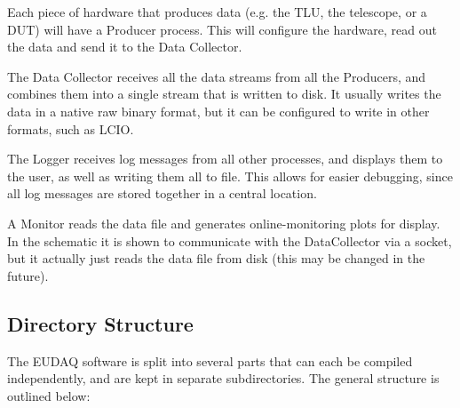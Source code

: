 Each piece of hardware that produces data (e.g. the \gls{TLU}, the telescope, or a \gls{DUT}) will have a Producer process.
This will configure the hardware, read out the data and send it to the Data Collector.

The Data Collector receives all the data streams from all the Producers,
and combines them into a single stream that is written to disk.
It usually writes the data in a native raw binary format,
but it can be configured to write in other formats, such as \gls{LCIO}.

The Logger receives log messages from all other processes,
and displays them to the user, as well as writing them all to file.
This allows for easier debugging, since all log messages are stored together in a central location.

A Monitor reads the data file and generates online-monitoring plots for display.
In the schematic it is shown to communicate with the DataCollector via a socket,
but it actually just reads the data file from disk (this may be changed in the future).

\subsection{Directory Structure}
The EUDAQ software is split into several parts that can each be compiled independently,
and are kept in separate subdirectories.
The general structure is outlined below:

